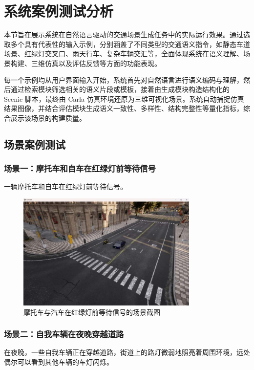 \chapter{系统案例测试分析}

本节旨在展示系统在自然语言驱动的交通场景生成任务中的实际运行效果。通过选取多个具有代表性的输入示例，分别涵盖了不同类型的交通语义指令，如静态车道场景、红绿灯交叉口、雨天行车、复杂车辆交汇等，全面体现系统在语义理解、场景构建、三维仿真以及评估反馈等方面的功能表现。

每一个示例均从用户界面输入开始，系统首先对自然语言进行语义编码与理解，然后通过检索模块筛选相关的语义片段或模板，接着由生成模块构造结构化的 Scenic 脚本，最终由 Carla 仿真环境还原为三维可视化场景。系统自动捕捉仿真结果图像，并结合评估模块生成语义一致性、多样性、结构完整性等量化指标，综合展示该场景的构建质量。
\section{场景案例测试}
\subsection{场景一：摩托车和自车在红绿灯前等待信号}
\indent 一辆摩托车和自车在红绿灯前等待信号。\\

\begin{figure}[H]
	\centering
	\includegraphics[width=0.8\textwidth]{"images/1.pdf"}
	\caption{摩托车与汽车在红绿灯前等待信号的场景截图}
	\label{fig:redlight_motorbike_car}
\end{figure}

\subsection{场景二：自我车辆在夜晚穿越道路}
\indent 在夜晚，一些自我车辆正在穿越道路，街道上的路灯微弱地照亮着周围环境，远处偶尔可以看到其他车辆的车灯闪烁。\\

